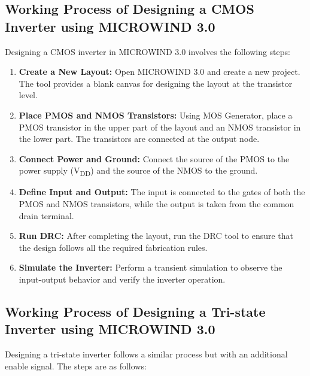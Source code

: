 \documentclass[a4paper,12pt]{article}
\begin{document}
\subsection{Working Process of Designing a CMOS Inverter using MICROWIND 3.0}
Designing a CMOS inverter in MICROWIND 3.0 involves the following steps:

\begin{enumerate}
	\item \textbf{Create a New Layout:} Open MICROWIND 3.0 and create a new project. The tool provides a blank canvas for designing the layout at the transistor level.
	\item \textbf{Place PMOS and NMOS Transistors:} Using MOS Generator, place a PMOS transistor in the upper part of the layout and an NMOS transistor in the lower part. The transistors are connected at the output node.
	\item \textbf{Connect Power and Ground:} Connect the source of the PMOS to the power supply (V\textsubscript{DD}) and the source of the NMOS to the ground.
	\item \textbf{Define Input and Output:} The input is connected to the gates of both the PMOS and NMOS transistors, while the output is taken from the common drain terminal.
	\item \textbf{Run DRC:} After completing the layout, run the DRC tool to ensure that the design follows all the required fabrication rules.
	\item \textbf{Simulate the Inverter:} Perform a transient simulation to observe the input-output behavior and verify the inverter operation.
\end{enumerate}

\subsection{Working Process of Designing a Tri-state Inverter using MICROWIND 3.0}
Designing a tri-state inverter follows a similar process but with an additional enable signal. The steps are as follows:
\end{document}
